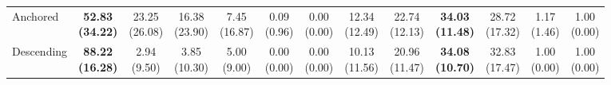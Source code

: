 {\begin{tabular}{l|cccccc|cccccc}
Anchored & \bfseries \makecell{52.83 \\ (34.22)} & \makecell{23.25 \\ (26.08)} & {\cellcolor[HTML]{C8E6C9}} \makecell{16.38 \\ (23.90)} & \makecell{7.45 \\ (16.87)} & \makecell{0.09 \\ (0.96)} & \makecell{0.00 \\ (0.00)} & \makecell{12.34 \\ (12.49)} & \makecell{22.74 \\ (12.13)} & {\cellcolor[HTML]{C8E6C9}} \bfseries \makecell{34.03 \\ (11.48)} & \makecell{28.72 \\ (17.32)} & \makecell{1.17 \\ (1.46)} & \makecell{1.00 \\ (0.00)} \\
Descending & \bfseries \makecell{88.22 \\ (16.28)} & \makecell{2.94 \\ (9.50)} & {\cellcolor[HTML]{C8E6C9}} \makecell{3.85 \\ (10.30)} & \makecell{5.00 \\ (9.00)} & \makecell{0.00 \\ (0.00)} & \makecell{0.00 \\ (0.00)} & \makecell{10.13 \\ (11.56)} & \makecell{20.96 \\ (11.47)} & {\cellcolor[HTML]{C8E6C9}} \bfseries \makecell{34.08 \\ (10.70)} & \makecell{32.83 \\ (17.47)} & \makecell{1.00 \\ (0.00)} & \makecell{1.00 \\ (0.00)} \\
\bottomrule
\end{tabular}
}%
